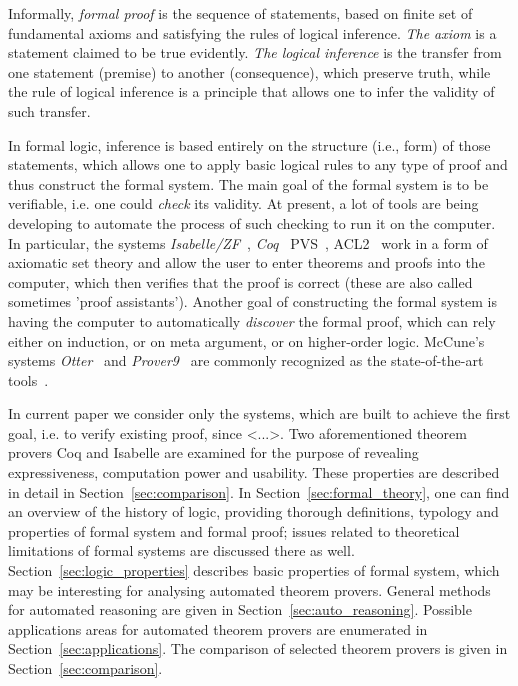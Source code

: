 \documentclass[article]{aaltoseries}
\begin{document}

Informally, \textit{formal proof} is the sequence of statements, based on finite set of fundamental axioms and satisfying the rules of logical inference. \textit{The axiom} is a statement claimed to be true evidently. \textit{The logical inference} is the transfer from one statement (premise) to another (consequence), which preserve truth, while the rule of logical inference is a principle that allows one to infer the validity of such transfer. 

In formal logic, inference is based entirely on the structure (i.e., form) of those statements, which allows one to apply basic logical rules to any type of proof and thus construct the formal system.
The main goal of the formal system is to be verifiable, i.e. one could \textit{check} its validity. At present, a lot of tools are being developing to automate the process of such checking to run it on the computer. In particular, the systems \textit{Isabelle/ZF}~\cite{Isabelle}, \textit{Coq}~\cite{Coq} PVS~\cite{Pvs}, ACL2~\cite{Acl} work in a form of axiomatic set theory and allow the user to enter theorems and proofs into the computer, which then verifies that the proof is correct (these are also called sometimes 'proof assistants').
Another goal of constructing the formal system is having the computer to automatically \textit{discover} the formal proof, which can rely either on induction, or on meta argument, or on higher-order logic. McCune’s systems \textit{Otter}~\cite{Otter} and \textit{Prover9}~\cite{Prover9} are commonly recognized as the state-of-the-art tools~\cite{Com00}.

In current paper we consider only the systems, which are built to achieve the first goal, i.e. to verify existing proof, since <...>. Two aforementioned theorem provers Coq and Isabelle are examined for the purpose of revealing expressiveness, computation power and usability. These properties are described in detail in Section~\ref{sec:comparison}. 
In Section~\ref{sec:formal_theory}, one can find an overview of the history of logic, providing thorough definitions, typology and properties of formal system and formal proof; issues related to theoretical limitations of formal systems are discussed there as well. Section~\ref{sec:logic_properties} describes basic properties of formal system, which may be interesting for analysing automated theorem provers. General methods for automated reasoning are given in Section~\ref{sec:auto_reasoning}. Possible applications areas for automated theorem provers are enumerated in Section~\ref{sec:applications}. The comparison of selected theorem provers is given in Section~\ref{sec:comparison}.
\end{document}

